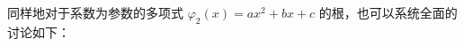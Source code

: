 同样地对于系数为参数的多项式
$\varphi_2 (x) =ax^2+bx+c$
的根，也可以系统全面的讨论如下：















\begin{example}
    
\end{example}

\begin{solution}
    
\end{solution}

\begin{example}
    
\end{example}


\begin{solution}
    
\end{solution}

\begin{solution}
    
\end{solution}

\begin{solution}
    
\end{solution}





\begin{example}
    
\end{example}

\begin{solution}
    
\end{solution}

\begin{solution}
    
\end{solution}

\begin{solution}
    
\end{solution}

\begin{example}
    
\end{example}

